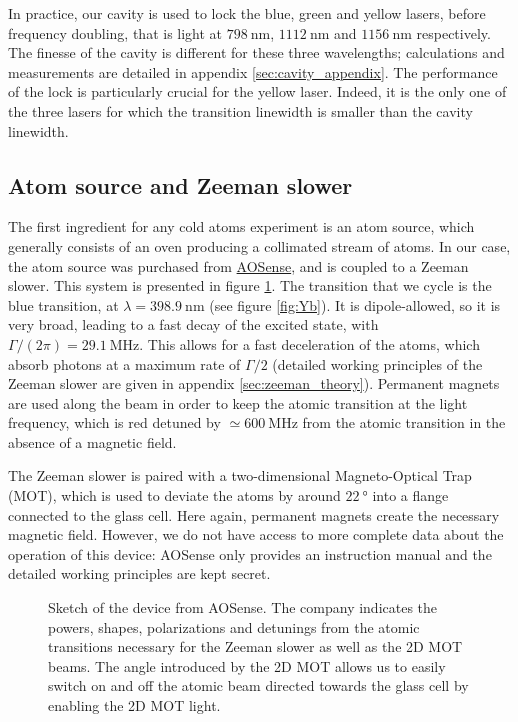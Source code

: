 \documentclass[11pt]{article}
\numberwithin{equation}{section}
\numberwithin{figure}{section}
\begin{document}
In practice, our cavity is used to lock the blue, green and yellow lasers, before frequency doubling, that is light at $\SI{798}{\nano\metre}$, $\SI{1112}{\nano\metre}$ and $\SI{1156}{\nano\metre}$ respectively. The finesse of the cavity is different for these three wavelengths; calculations and measurements are detailed in appendix \ref{sec:cavity_appendix}. The performance of the lock is particularly crucial for the yellow laser. Indeed, it is the only one of the three lasers for which the transition linewidth is smaller than the cavity linewidth.

\subsection{Atom source and Zeeman slower}
\label{sec:oven}

The first ingredient for any cold atoms experiment is an atom source, which generally consists of an oven producing a collimated stream of atoms. In our case, the atom source was purchased from \href{https://aosense.com/product/cold-atomic-beam-system/}{AOSense}, and is coupled to a Zeeman slower.
This system is presented in figure \ref{fig:ZS}. The transition that we cycle is the blue transition, at $\lambda = \SI{398.9}{\nano\metre}$ (see figure \ref{fig:Yb}). It is dipole-allowed, so it is very broad, leading to a fast decay of the excited state, with $\Gamma / (2 \pi)= \SI{29.1}{\mega\hertz}$. This allows for a fast deceleration of the atoms, which absorb photons at a maximum rate of $\Gamma/2$ (detailed working principles of the Zeeman slower are given in appendix \ref{sec:zeeman_theory}). Permanent magnets are used along the beam in order to keep the atomic transition at the light frequency, which is red detuned by $\simeq \SI{600}{\mega\hertz}$ from the atomic transition in the absence of a magnetic field.  

The Zeeman slower is paired with a two-dimensional Magneto-Optical Trap (MOT), which is used to deviate the atoms by around $\SI{22}{\degree}$ into a flange connected to the glass cell. Here again, permanent magnets create the necessary magnetic field. However, we do not have access to more complete data about the operation of this device: AOSense only provides an instruction manual and the detailed working principles are kept secret.
%
\begin{figure}[htbp]
	\centering
	\def\svgwidth{0.7\linewidth}
    
	\caption{\small Sketch of the device from AOSense. The company indicates the powers, shapes, polarizations and detunings from the atomic transitions necessary for the Zeeman slower as well as the 2D MOT beams. The angle introduced by the 2D MOT allows us to easily switch on and off the atomic beam directed towards the glass cell by enabling the 2D MOT light.}
    \label{fig:ZS}
\end{figure}
%
\end{document}

